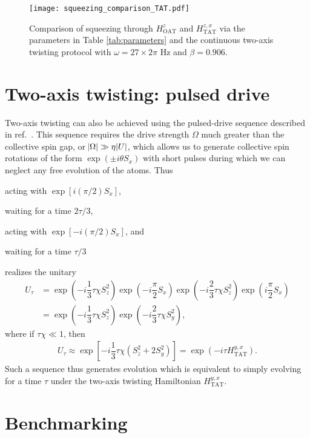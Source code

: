 \documentclass[aps,notitlepage,nofootinbib,11pt]{revtex4-1}
\renewcommand{\t}{\text} %
\newcommand{\f}[2]{\dfrac{#1}{#2}} %
\newcommand{\p}[1]{\left(#1\right)} %
\renewcommand{\sp}[1]{\left[#1\right]} %
\newcommand{\1}{\mathds{1}}
\begin{document}
\begin{figure}
  \centering \texttt{[image: squeezing\_comparison\_TAT.pdf]}
  \caption{Comparison of squeezing through $H_{\t{OAT}}^z$ and
    $H_{\t{TAT}}^{z,x}$ via the parameters in Table
    \ref{tab:parameters} and the continuous two-axis twisting protocol
    with $\omega=27\times2\pi$ Hz and $\beta=0.906$.}
  \label{fig:squeezing_comparison_TAT}
\end{figure}


\section{Two-axis twisting: pulsed drive}

Two-axis twisting can also be achieved using the pulsed-drive sequence
described in ref.~\cite{liu2011spin}.  This sequence requires the
drive strength $\Omega$ much greater than the collective spin gap, or
$\abs{\Omega}\gg\eta\abs{U}$, which allows us to generate collective
spin rotations of the form $\exp\p{\pm i\theta S_x}$ with short pulses
during which we can neglect any free evolution of the atoms.  Thus
\begin{enumerate*}[label=(\roman*)]
\item acting with $\exp\sp{i\p{\pi/2}S_x}$,
\item waiting for a time $2\tau/3$,
\item acting with $\exp\sp{-i\p{\pi/2}S_x}$, and
\item waiting for a time $\tau/3$
\end{enumerate*}
realizes the unitary
\begin{align}
  U_\tau
  &= \exp\p{-i\f13\tau\chi S_z^2} \exp\p{-i\f{\pi}{2}S_x}
  \exp\p{-i\f23\tau\chi S_z^2} \exp\p{i\f{\pi}{2}S_x} \\
  &= \exp\p{-i\f13\tau\chi S_z^2} \exp\p{-i\f23\tau\chi S_y^2},
\end{align}
where if $\tau\chi\ll1$, then
\begin{align}
  U_\tau \approx \exp\sp{-i\f13\tau\chi\p{S_z^2 + 2S_y^2}}
  = \exp\p{-i\tau H_{\t{TAT}}^{y,x}}.
\end{align}
Such a sequence thus generates evolution which is equivalent to simply
evolving for a time $\tau$ under the two-axis twisting Hamiltonian
$H_{\t{TAT}}^{y,x}$.


\section{Benchmarking}
\end{document}
